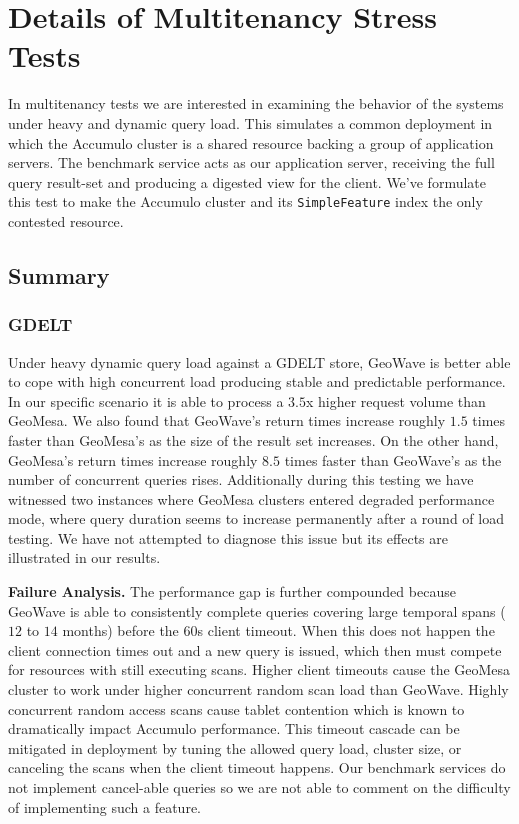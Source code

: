 \section{Details of Multitenancy Stress Tests}
\label{appendix:multitenancy}

In multitenancy tests we are interested in examining the behavior of the systems under heavy and dynamic query load.
This simulates a common deployment in which the Accumulo cluster is a shared resource backing a group of application servers.
The benchmark service acts as our application server, receiving the full query result-set and producing a digested view for the client.
We’ve formulate this test to make the Accumulo cluster and its \texttt{SimpleFeature} index the only contested resource.

\subsection{Summary}

\subsubsection{GDELT}

Under heavy dynamic query load against a GDELT store, GeoWave is better able to cope with high concurrent load producing stable and predictable performance.
In our specific scenario it is able to process a $3.5$x higher request volume than GeoMesa.
We also found that GeoWave's return times increase roughly $1.5$ times faster than GeoMesa's as the size of the result set increases.
On the other hand, GeoMesa's return times increase roughly $8.5$ times faster than GeoWave's as the number of concurrent queries rises.
Additionally during this testing we have witnessed two instances where GeoMesa clusters entered degraded performance mode, where query duration seems to
increase permanently after a round of load testing.
We have not attempted to diagnose this issue but its effects are illustrated in our results.

{\bf Failure Analysis.}
The performance gap is further compounded because GeoWave is able to consistently complete queries covering large temporal spans ($12$ to $14$ months) before the $60$s client timeout.
When this does not happen the client connection times out and a new query is issued, which then must compete for resources with still executing scans.
Higher client timeouts cause the GeoMesa cluster to work under higher concurrent random scan load than GeoWave.
Highly concurrent random access scans cause tablet contention which is known to dramatically impact Accumulo performance.
This timeout cascade can be mitigated in deployment by tuning the allowed query load, cluster size, or canceling the scans when the client timeout happens.
Our benchmark services do not implement cancel-able queries so we are not able to comment on the difficulty of implementing such a feature.

